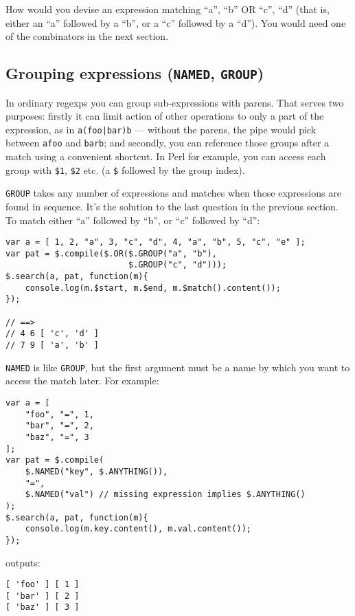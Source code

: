 \documentclass[a4paper,10pt]{article}
\begin{document}
How would you devise an expression matching “a”, “b” OR “c”, “d” (that is,
either an “a” followed by a “b”, or a “c” followed by a “d”).  You would
need one of the combinators in the next section.
\subsection{Grouping expressions (\texttt{NAMED}, \texttt{GROUP})}
\label{sec-2-6}


In ordinary regexps you can group sub-expressions with parens.  That serves
two purposes: firstly it can limit action of other operations to only a part
of the expression, as in \texttt{a(foo|bar)b} — without the parens, the pipe would
pick between \texttt{afoo} and \texttt{barb}; and secondly, you can reference those groups
after a match using a convenient shortcut.  In Perl for example, you can
access each group with \texttt{\$1}, \texttt{\$2} etc. (a \texttt{\$} followed by the group index).

\texttt{GROUP} takes any number of expressions and matches when those expressions
are found in sequence.  It's the solution to the last question in the
previous section.  To match either “a” followed by “b”, or “c” followed by
“d”:


\begin{verbatim}
var a = [ 1, 2, "a", 3, "c", "d", 4, "a", "b", 5, "c", "e" ];
var pat = $.compile($.OR($.GROUP("a", "b"),
                         $.GROUP("c", "d")));
$.search(a, pat, function(m){
    console.log(m.$start, m.$end, m.$match().content());
});

// ==>
// 4 6 [ 'c', 'd' ]
// 7 9 [ 'a', 'b' ]
\end{verbatim}

\texttt{NAMED} is like \texttt{GROUP}, but the first argument must be a name by which you
want to access the match later.  For example:


\begin{verbatim}
var a = [
    "foo", "=", 1,
    "bar", "=", 2,
    "baz", "=", 3
];
var pat = $.compile(
    $.NAMED("key", $.ANYTHING()),
    "=",
    $.NAMED("val") // missing expression implies $.ANYTHING()
);
$.search(a, pat, function(m){
    console.log(m.key.content(), m.val.content());
});
\end{verbatim}

outputs:


\begin{verbatim}
[ 'foo' ] [ 1 ]
[ 'bar' ] [ 2 ]
[ 'baz' ] [ 3 ]
\end{verbatim}
\end{document}
